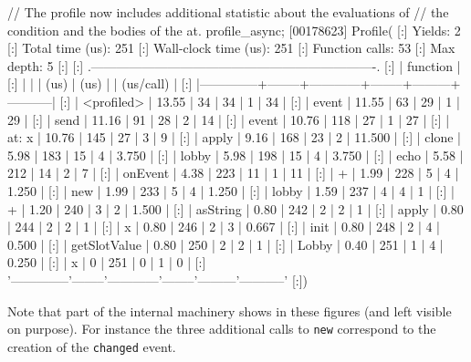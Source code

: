 \begin{urbiscript}
// The profile now includes additional statistic about the evaluations of
// the condition and the bodies of the at.
profile_async;
[00178623] Profile(
[:]  Yields:                    2
[:]  Total time (us):         251
[:]  Wall-clock time (us):    251
[:]  Function calls:           53
[:]  Max depth:                 5
[:]
[:]  .-------------------------------------------------------------------.
[:]  |   function   |   %
[:]  |              |        |    (us)    |  (us)  |         | (us/call) |
[:]  |--------------+--------+------------+--------+---------+-----------|
[:]  |   <profiled> |  13.55 |         34 |     34 |       1 |        34 |
[:]  |        event |  11.55 |         63 |     29 |       1 |        29 |
[:]  |         send |  11.16 |         91 |     28 |       2 |        14 |
[:]  |        event |  10.76 |        118 |     27 |       1 |        27 |
[:]  |    at: { x } |  10.76 |        145 |     27 |       3 |         9 |
[:]  |        apply |   9.16 |        168 |     23 |       2 |    11.500 |
[:]  |        clone |   5.98 |        183 |     15 |       4 |     3.750 |
[:]  |        lobby |   5.98 |        198 |     15 |       4 |     3.750 |
[:]  |         echo |   5.58 |        212 |     14 |       2 |         7 |
[:]  |      onEvent |   4.38 |        223 |     11 |       1 |        11 |
[:]  |            + |   1.99 |        228 |      5 |       4 |     1.250 |
[:]  |          new |   1.99 |        233 |      5 |       4 |     1.250 |
[:]  |        lobby |   1.59 |        237 |      4 |       4 |         1 |
[:]  |            + |   1.20 |        240 |      3 |       2 |     1.500 |
[:]  |     asString |   0.80 |        242 |      2 |       2 |         1 |
[:]  |        apply |   0.80 |        244 |      2 |       2 |         1 |
[:]  |            x |   0.80 |        246 |      2 |       3 |     0.667 |
[:]  |         init |   0.80 |        248 |      2 |       4 |     0.500 |
[:]  | getSlotValue |   0.80 |        250 |      2 |       2 |         1 |
[:]  |        Lobby |   0.40 |        251 |      1 |       4 |     0.250 |
[:]  |            x |      0 |        251 |      0 |       1 |         0 |
[:]  '--------------'--------'------------'--------'---------'-----------'
[:])
\end{urbiscript}

Note that part of the internal machinery shows in these figures (and left
visible on purpose).  For instance the three additional calls to
\lstinline{new} correspond to the creation of the \lstinline{changed} event.

